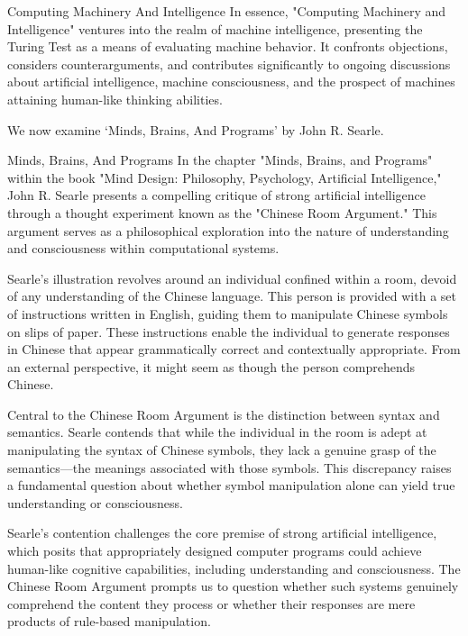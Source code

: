 \begin{notes}{Computing Machinery And Intelligence}
    In essence, "Computing Machinery and Intelligence" ventures into the realm of machine intelligence, presenting the Turing Test as a means of evaluating machine behavior. It confronts objections, 
    considers counterarguments, and contributes significantly to ongoing discussions about artificial intelligence, machine consciousness, and the prospect of machines attaining human-like thinking abilities.
\end{notes}

We now examine `Minds, Brains, And Programs' by John R. Searle.

\begin{notes}{Minds, Brains, And Programs}
    In the chapter "Minds, Brains, and Programs" within the book "Mind Design: Philosophy, Psychology, Artificial Intelligence," John R. Searle presents a compelling critique of strong artificial 
    intelligence through a thought experiment known as the "Chinese Room Argument." This argument serves as a philosophical exploration into the nature of understanding and consciousness within 
    computational systems.

    Searle's illustration revolves around an individual confined within a room, devoid of any understanding of the Chinese language. This person is provided with a set of instructions written in 
    English, guiding them to manipulate Chinese symbols on slips of paper. These instructions enable the individual to generate responses in Chinese that appear grammatically correct and contextually 
    appropriate. From an external perspective, it might seem as though the person comprehends Chinese.

    Central to the Chinese Room Argument is the distinction between syntax and semantics. Searle contends that while the individual in the room is adept at manipulating the syntax of Chinese symbols, 
    they lack a genuine grasp of the semantics—the meanings associated with those symbols. This discrepancy raises a fundamental question about whether symbol manipulation alone can yield true understanding 
    or consciousness.

    Searle's contention challenges the core premise of strong artificial intelligence, which posits that appropriately designed computer programs could achieve human-like cognitive capabilities, 
    including understanding and consciousness. The Chinese Room Argument prompts us to question whether such systems genuinely comprehend the content they process or whether their responses are mere 
    products of rule-based manipulation.


\end{notes}
